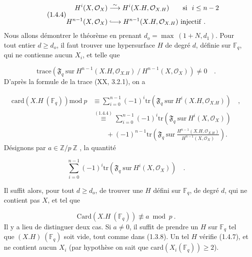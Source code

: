 \begin{equation}\tag{1.4.4}
\begin{aligned} H^i(X,\mathcal{O}_X) &\stackrel{\sim}{\longrightarrow} H^i(X.H,\mathcal{O}_{X.H}) \qquad \mathrm{si}\ \ i \leq n - 2 \\[1ex] H^{n-1}(X,\mathcal{O}_X) &\lhook\joinrel\longrightarrow H^{n-1}(X.H,\mathcal{O}_{X.H})\ \mathrm{injectif}\ . \end{aligned}
\end{equation}
Nous allons démontrer le théorème en prenant $d_o = \max\ (1+N,d_1)$. Pour tout entier $d \geq d_o$, il faut trouver une hypersurface $H$ de degré $d$, définie sur $\mathbb{F}_q$, qui ne contienne aucun $X_i$, et telle que

\begin{equation}\tag{1.4.5}
\mathrm{trace}(\mathfrak{F}_q\ \mathrm{sur}\ H^{n-1}(X.H,\mathcal{O}_{X.H})\ /\ H^{n-1}(X,\mathcal{O}_X)) \neq 0 \quad .
\end{equation}
D'après la formule de la trace (XX, 3.2.1), on a

\begin{equation}\tag{1.4.6}
\begin{aligned}
\mathrm{card}(X.H\ (\mathbb{F}_q))\mathrm{mod}\ p
&\equiv \sum_{i=0}^{n-1}(-1)^i
\mathrm{tr}(\mathfrak{F}_q\ \mathrm{sur}\ H^i(X.H,\mathcal{O}_{X.H})) \quad , \\
&\stackrel{(1.4.4)}{\equiv} \sum_{i=0}^{n-1}(-1)^i
\mathrm{tr}(\mathfrak{F}_q\ \mathrm{sur}\ H^i(X,\mathcal{O}_X)) \\
&\qquad +(-1)^{n-1}\mathrm{tr}\!\left(\mathfrak{F}_q\ \mathrm{sur}\
\frac{H^{n-1}(X.H,\mathcal{O}_{X.H})}{H^{n-1}(X,\mathcal{O}_X)}\right) .
\end{aligned}
\end{equation}
Désignons par $a \in \mathbb{Z}/p\ \mathbb{Z}$ , la quantité

\begin{equation*}
\sum_{i=0}^{n-1} (-1)^i \mathrm{tr}(\mathfrak{F}_q\ \mathrm{sur}\ H^i(X,\mathcal{O}_X)) \quad .
\end{equation*}


Il suffit alors, pour tout $d \geq d_o$, de trouver une $H$ défini sur $\mathbb{F}_q$, de degré $d$, qui ne contient pas $X$, et tel que

\begin{equation}\tag{1.4.7}
\mathrm{Card}(X.H\ (\mathbb{F}_q)) \not\equiv a \bmod p \ .
\end{equation}
Il y a lieu de distinguer deux cas. Si $a \neq 0$, il suffit de prendre un $H$ sur $\mathbb{F}_q$ tel que $(X.H)\ (\mathbb{F}_q)$ soit vide, tout comme dans (1.3.8). Un tel $H$ vérifie (1.4.7), et ne contient aucun $X_i$ (par hypothèse on sait que $\mathrm{card}(X_i(\mathbb{F}_q)) \geq 2$).

